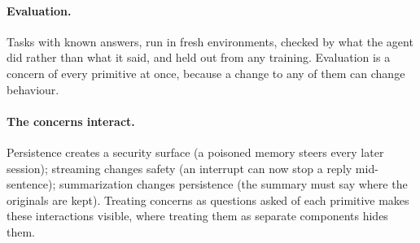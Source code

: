 \paragraph{Evaluation.} Tasks with known answers, run in fresh environments, checked by what the agent did rather than what it said, and held out from any training. Evaluation is a concern of every primitive at once, because a change to any of them can change behaviour.

\paragraph{The concerns interact.} Persistence creates a security surface (a poisoned memory steers every later session); streaming changes safety (an interrupt can now stop a reply mid-sentence); summarization changes persistence (the summary must say where the originals are kept). Treating concerns as questions asked of each primitive makes these interactions visible, where treating them as separate components hides them.
